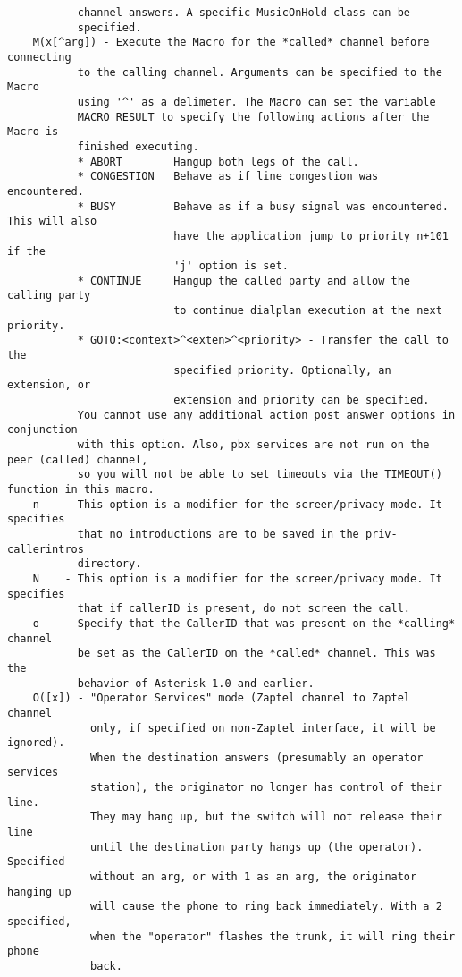 \begin{verbatim}
           channel answers. A specific MusicOnHold class can be
           specified.
    M(x[^arg]) - Execute the Macro for the *called* channel before connecting
           to the calling channel. Arguments can be specified to the Macro
           using '^' as a delimeter. The Macro can set the variable
           MACRO_RESULT to specify the following actions after the Macro is
           finished executing.
           * ABORT        Hangup both legs of the call.
           * CONGESTION   Behave as if line congestion was encountered.
           * BUSY         Behave as if a busy signal was encountered. This will also
                          have the application jump to priority n+101 if the
                          'j' option is set.
           * CONTINUE     Hangup the called party and allow the calling party
                          to continue dialplan execution at the next priority.
           * GOTO:<context>^<exten>^<priority> - Transfer the call to the
                          specified priority. Optionally, an extension, or
                          extension and priority can be specified.
           You cannot use any additional action post answer options in conjunction
           with this option. Also, pbx services are not run on the peer (called) channel,
           so you will not be able to set timeouts via the TIMEOUT() function in this macro.
    n    - This option is a modifier for the screen/privacy mode. It specifies
           that no introductions are to be saved in the priv-callerintros
           directory.
    N    - This option is a modifier for the screen/privacy mode. It specifies
           that if callerID is present, do not screen the call.
    o    - Specify that the CallerID that was present on the *calling* channel
           be set as the CallerID on the *called* channel. This was the
           behavior of Asterisk 1.0 and earlier.
    O([x]) - "Operator Services" mode (Zaptel channel to Zaptel channel
             only, if specified on non-Zaptel interface, it will be ignored).
             When the destination answers (presumably an operator services
             station), the originator no longer has control of their line.
             They may hang up, but the switch will not release their line
             until the destination party hangs up (the operator). Specified
             without an arg, or with 1 as an arg, the originator hanging up
             will cause the phone to ring back immediately. With a 2 specified,
             when the "operator" flashes the trunk, it will ring their phone
             back.

\end{verbatim}

